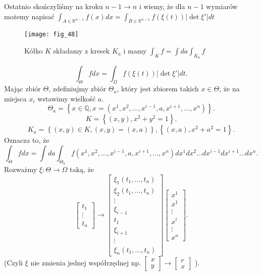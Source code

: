 \documentclass[../main.tex]{subfiles}
\begin{document}
Ostatnio skończyliśmy na kroku $n-1\to n$ i wiemy, że dla $n-1$ wymiarów możemy napisać $\int_{A\in \mathbb{R}^{n-1}}f(x)dx = \int_{B\in \mathbb{R}^{n-1}}f(\xi(t)) |\det \xi'|dt$
\begin{figure}[h]
    \centering
    \texttt{[image: fig\_48]}
    \caption{Kółko $K$ składamy z kresek $K_a$ i mamy $\int_K f = \int da \int_{K_a} f$}
    \label{fig:fig_48}
\end{figure}
\[
    \int_{\Theta} f dx = \int_{\Omega}f(\xi(t))|\det \xi'|dt
.\]
Mając zbiór $\Theta$, zdefiniujmy zbiór $\Theta_a$, który jest zbiorem takich $x\in\Theta$, że na miejsca $x_i$ wstawimy wielkość $a$.
\[
    \Theta_a = \left\{ x\in \mathbb{Q}, x = \left( x^1,x^2,\ldots,x^{i-1},a,x^{i+1},\ldots,x^n \right)  \right\}
.\]
\[
    K = \left\{ (x,y), x^2+y^2 = 1 \right\}
.\]
\[
    K_a = \left\{ (x,y)\in K, (x,y) = (x,a) \right\}, \left\{ (x,a), x^2+a^2 = 1 \right\}
.\]
Oznacza to, że
\[
    \int_\Theta f dx = \int da \int_{\Theta_a}f(x^1,x^2,\ldots,x^{i-1},a,x^{i+1},\ldots,x^n) dx^1 dx^2 \ldots dx^{i-1} dx^{i+1}\ldots dx^n
.\]
Rozważmy $\xi: \Theta \to \Omega$ taką, że
\[
    \begin{bmatrix} t_1\\ \vdots \\ t_n \end{bmatrix} \to \begin{bmatrix} \xi_1(t_1,\ldots,t_n)\\ \xi_2(t_1,\ldots,t_n) \\ \vdots \\ \xi_{i-1} \\ t_1 \\ \xi_{i+1} \\ \vdots \\ \xi_n(t_1,\ldots,t_n)
\end{bmatrix} \begin{bmatrix} x^1\\x^1\\ \vdots \\ x^i \\ \vdots \\ x^n \end{bmatrix}
.\]
(Czyli $\xi$ nie zmienia jednej współrzędnej np. $\begin{bmatrix} x\\y \end{bmatrix} \to \begin{bmatrix} r\\x \end{bmatrix} $ ).\\
\end{document}
